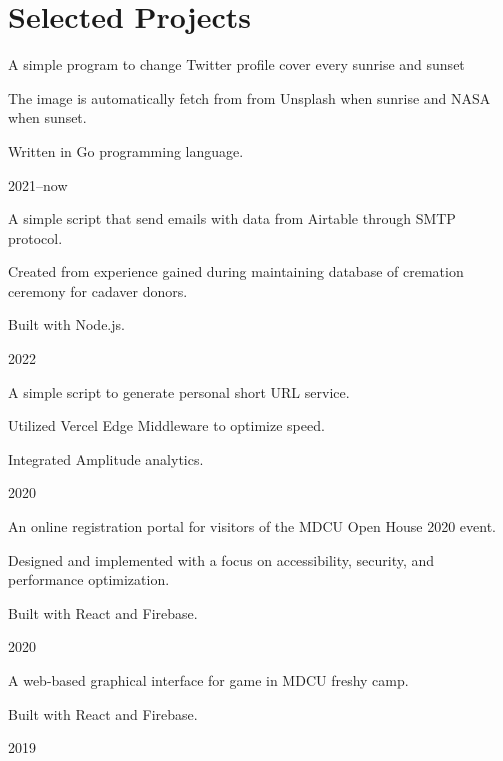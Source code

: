 \documentclass{cv}
\begin{document}
\section{Selected Projects}
\begin{cv_table}
  {\begin{cv_itemize}
      \item A simple program to change Twitter profile cover every sunrise and sunset
      \item The image is automatically fetch from from Unsplash when sunrise and NASA when sunset.
      \item Written in Go programming language.
    \end{cv_itemize}
  }{}{2021--now}
  {\begin{cv_itemize}
      \item A simple script that send emails with data from Airtable through SMTP protocol.
      \item Created from experience gained during maintaining database of cremation ceremony for cadaver donors.
      \item Built with Node.js.
    \end{cv_itemize}
  }{}{2022}
  {\begin{cv_itemize}
      \item A simple script to generate personal short URL service.
      \item Utilized Vercel Edge Middleware to optimize speed.
      \item Integrated Amplitude analytics.
    \end{cv_itemize}
  }{}{2020}
  {\begin{cv_itemize}
      \item An online registration portal for visitors of the MDCU Open House 2020 event.
      \item Designed and implemented with a focus on accessibility, security, and performance optimization.
      \item Built with React and Firebase.
    \end{cv_itemize}
  }{}{2020}
  {\begin{cv_itemize}
      \item A web-based graphical interface for game in MDCU freshy camp.
      \item Built with React and Firebase.
    \end{cv_itemize}
  }{}{2019}
\end{cv_table}
\end{document}
